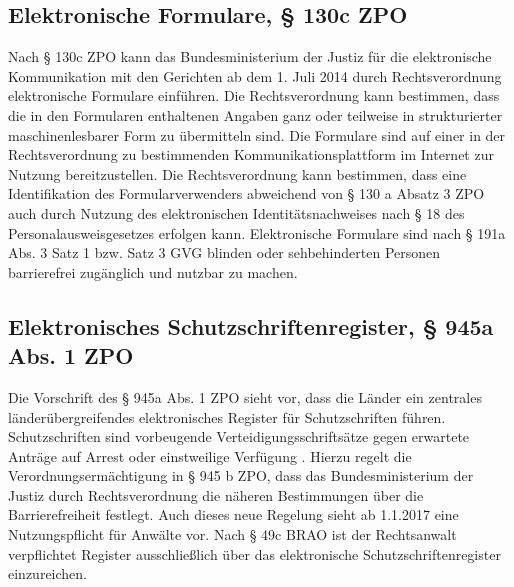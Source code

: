 \subsection{Elektronische Formulare, § 130c ZPO}
Nach § 130c ZPO kann das Bundesministerium der Justiz für die elektronische Kommunikation mit den Gerichten ab dem 1. Juli 2014 durch Rechtsverordnung elektronische Formulare einführen. Die Rechtsverordnung kann bestimmen, dass die in den Formularen enthaltenen Angaben ganz oder teilweise in strukturierter maschinenlesbarer Form zu übermitteln sind. Die Formulare sind auf einer in der Rechtsverordnung zu bestimmenden Kommunikationsplattform im Internet zur Nutzung bereitzustellen.  Die Rechtsverordnung kann bestimmen, dass eine Identifikation des Formularverwenders abweichend von § 130 a Absatz 3 ZPO auch durch Nutzung des elektronischen Identitätsnachweises nach § 18 des Personalausweisgesetzes erfolgen kann. Elektronische Formulare sind nach § 191a Abs. 3 Satz 1 bzw. Satz 3 GVG blinden oder sehbehinderten Personen barrierefrei zugänglich und nutzbar zu machen.
\subsection{Elektronisches Schutzschriftenregister, § 945a Abs. 1 ZPO}
Die Vorschrift des § 945a Abs. 1 ZPO sieht vor, dass die Länder ein zentrales länderübergreifendes elektronisches Register für Schutzschriften führen. Schutzschriften sind vorbeugende Verteidigungsschriftsätze gegen erwartete Anträge auf Arrest oder einstweilige Verfügung . Hierzu regelt die Verordnungsermächtigung in § 945 b ZPO, dass das Bundesministerium der Justiz durch Rechtsverordnung die näheren Bestimmungen über die Barrierefreiheit festlegt.
Auch dieses neue Regelung sieht ab 1.1.2017 eine Nutzungspflicht für Anwälte vor. Nach § 49c BRAO ist der Rechtsanwalt verpflichtet Register ausschließlich über das elektronische Schutzschriftenregister einzureichen.